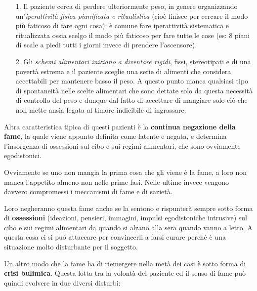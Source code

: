 \begin{itemize}
\item[1.]
  Il paziente cerca di perdere ulteriormente peso, in genere
  organizzando un'\emph{iperattività fisica pianificata e ritualistica}
  (cioè finisce per cercare il modo più faticoso di fare ogni cosa): è
  comune fare iperattività sistematica e ritualizzata ossia scelgo il
  modo più faticoso per fare tutte le cose (es: 8 piani di scale a piedi
  tutti i giorni invece di prendere l'ascensore).
\item[2.]
  Gli \emph{schemi alimentari iniziano a diventare rigidi}, fissi,
  stereotipati e di una povertà estrema e il paziente sceglie una serie
  di alimenti che considera accettabili per mantenere basso il peso. A
  questo punto manca qualsiasi tipo di spontaneità nelle scelte
  alimentari che sono dettate solo da questa necessità di controllo del
  peso e dunque dal fatto di accettare di mangiare solo ciò che non
  mette ansia legata al timore indicibile di ingrassare.
\end{itemize}

Altra caratteristica tipica di questi pazienti è la \textbf{continua
negazione della fame}, la quale viene appunto definita come latente e
negata, e determina l'insorgenza di ossessioni sul cibo e sui regimi
alimentari, che sono ovviamente egodistonici.

Ovviamente se uno non mangia la prima cosa che gli viene è la fame, a
loro non manca l'appetito almeno non nelle prime fasi. Nelle ultime
invece vengono davvero compromessi i meccanismi di fame e di sazietà.

Loro negheranno questa fame anche se la sentono e rispunterà sempre
sotto forma di \textbf{ossessioni} (ideazioni, pensieri, immagini,
impulsi egodistoniche intrusive) sul cibo e sui regimi alimentari da
quando si alzano alla sera quando vanno a letto. A questa cosa ci si può
attaccare per convincerli a farsi curare perché è una situazione molto
disturbante per il soggetto.

Un altro modo che la fame ha di riemergere nella metà dei casi è sotto
forma di \textbf{crisi bulimica}. Questa lotta tra la volontà del
paziente ed il senso di fame può quindi evolvere in due diversi
disturbi:

